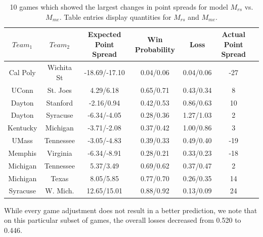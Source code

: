 \documentclass[letterpaper,12pt]{article}
\begin{document}
\begin{table}[h!]
\caption{10 games which showed the largest changes in point spreads for model $M_{rs}$ vs. $M_{me}$. Table entries display quantities for $M_{rs}$ and $M_{me}$.\label{tab:change}}
\scriptsize
\centering
\begin{tabular}{|cc | ccc |c|c|}
  \hline
  \hline
 $Team_1$ & $Team_2$ & Expected Point Spread & Win Probability & Loss & Actual Point Spread\\ 
  \hline
 Cal Poly & Wichita St & -18.69/-17.10  & 0.04/0.06 & 0.04/0.06&  -27\\ 
 UConn & St. Joes &4.29/6.18 & 0.65/0.71 & 0.43/0.34  & 8\\ 
 Dayton & Stanford & -2.16/0.94 & 0.42/0.53 & 0.86/0.63& 10 \\ 
 Dayton & Syracuse & -6.34/-4.05 & 0.28/0.36 & 1.27/1.03& 2\\ 
 Kentucky & Michigan & -3.71/-2.08 & 0.37/0.42 & 1.00/0.86 & 3\\ 
 UMass & Tennessee &-3.05/-4.83 & 0.39/0.33 & 0.49/0.40 & -19\\ 
 Memphis & Virginia & -6.34/-8.91 & 0.28/0.21 & 0.33/0.23 & -18\\ 
 Michigan & Tennessee & 5.37/3.49 & 0.69/0.62 & 0.37/0.47 & 2\\ 
 Michigan & Texas & 8.05/5.85 & 0.77/0.70 & 0.26/0.35 & 14\\ 
 Syracuse & W. Mich. & 12.65/15.01 & 0.88/0.92 & 0.13/0.09& 24\\ 
   \hline
   \hline
\end{tabular}
\end{table}
While every game adjustment does not result in a better prediction,  we note that on this particular subset of games, the overall losses decreased from 0.520 to 0.446. 
\end{document}

